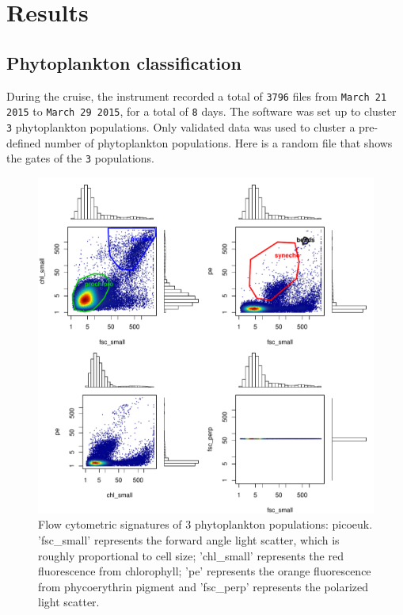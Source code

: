 \documentclass[a4paper]{article}
\begin{document}
\newpage
\section{Results}
\subsection{Phytoplankton classification}
During the cruise, the instrument recorded a total of \texttt{3796} files from \texttt{March 21 2015} to \texttt{March 29 2015}, for a total of \texttt{8} days. The software was set up to cluster \texttt{3} phytoplankton populations. Only validated data was used to cluster a pre-defined number of phytoplankton populations. Here is a random file that shows the gates of the \texttt{3} populations.%


\begin{figure}[H]
\centering
\includegraphics{CruiseReport-002}
\caption{Flow cytometric signatures of 3 phytoplankton populations: picoeuk. 'fsc\_small' represents the forward angle light scatter, which is roughly proportional to cell size; 'chl\_small' represents the red fluorescence from chlorophyll; 'pe' represents the orange fluorescence from phycoerythrin pigment and 'fsc\_perp' represents the polarized light scatter.}
\end{figure}
\end{document}
